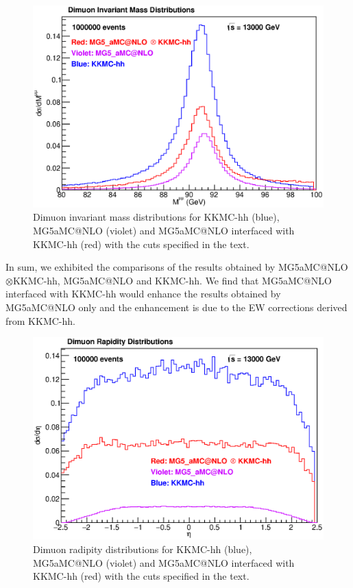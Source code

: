 \begin{figure}
	\begin{center}
		\includegraphics[scale=0.65]{MLL.eps}
		\caption{ Dimuon invariant mass distributions for KKMC-hh (blue), MG5\textunderscore aMC@NLO (violet) and MG5\textunderscore aMC@NLO interfaced with KKMC-hh (red) with the cuts specified in the text. }
	\end{center}
\end{figure} 

In sum, we exhibited the comparisons of the results obtained by MG5\textunderscore aMC@\newline NLO$\otimes$KKMC-hh, MG5\textunderscore aMC@NLO and KKMC-hh. We find that MG5\textunderscore aMC@NLO interfaced with KKMC-hh would enhance the results obtained by MG5\textunderscore aMC@NLO only and the enhancement is due to the EW corrections derived from KKMC-hh.

\begin{figure}
	\begin{center}
		\includegraphics[scale=0.65]{Y.eps}
		\caption{ Dimuon radipity distributions for KKMC-hh (blue), MG5\textunderscore aMC@NLO (violet) and MG5\textunderscore aMC@NLO interfaced with KKMC-hh (red) with the cuts specified in the text. }
	\end{center}
\end{figure}